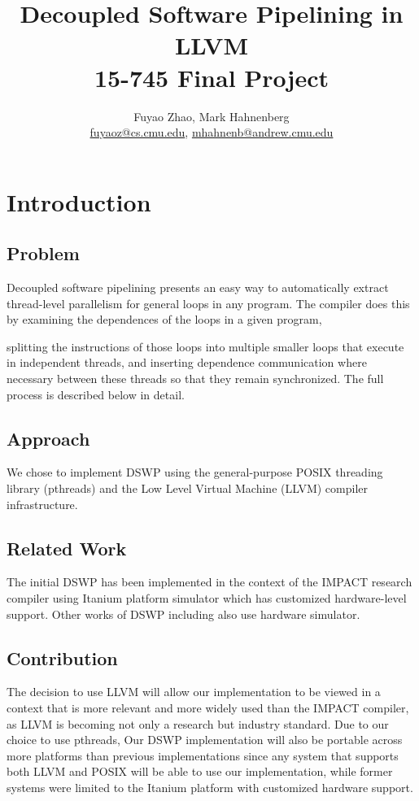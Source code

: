 \documentclass[11pt, letter]{article}
\title{Decoupled Software Pipelining in LLVM \\
        {\large 15-745 Final Project}}
\author{Fuyao Zhao, Mark Hahnenberg\\
\url{fuyaoz@cs.cmu.edu}, \url{mhahnenb@andrew.cmu.edu}
}
\date{}
\begin{document}
\maketitle

\section{Introduction}
\subsection{Problem}
Decoupled software pipelining \cite{DSWP} presents an easy way to automatically extract thread-level parallelism for general loops in any program.  The compiler does this by examining the dependences of the loops in a given program, 

splitting the instructions of those loops into multiple smaller loops that execute in independent threads, and inserting dependence communication where necessary between these threads so that they remain synchronized.  The full process is described below in detail.  

\subsection{Approach}
We chose to implement DSWP using the general-purpose POSIX threading library (pthreads) and the Low Level Virtual Machine (LLVM) compiler infrastructure.  

\subsection{Related Work}
The initial DSWP has been implemented in the context of the IMPACT research compiler using Itanium platform simulator which has customized hardware-level support. Other works of DSWP including \cite{Sp-DSWP,PS-DSWP} also use hardware simulator.

\subsection{Contribution}
The decision to use LLVM will allow our implementation to be viewed in a context that is more relevant and more widely used than the IMPACT compiler, as LLVM is becoming not only a research but industry standard.  Due to our choice to use pthreads, Our DSWP implementation will also be portable across more platforms than previous implementations since any system that supports both LLVM and POSIX will be able to use our implementation, while former systems were limited to the Itanium platform with customized hardware support.
\end{document}
